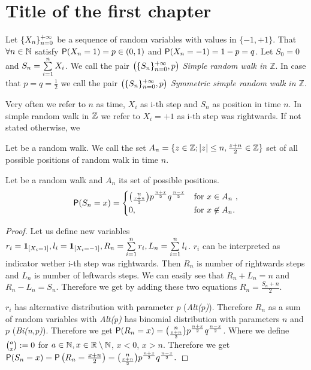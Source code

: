 \chapter{Title of the first chapter}

\begin{defn}\label{def01:1}
  Let $\{X_n\}_{n=0}^{+\infty}$ be a sequence of \iid random variables with values in $\{ -1, +1\}$. That $\forall n \in \mathbb{N}$ satisfy $\operatorname{\textsf{P}}(X_n=1)=p \in (0,1)$ and $\operatorname{\textsf{P}}(X_n=-1)=1-p=q$. Let $S_0=0$ and $S_n=\suma[i][1][n]X_i$. We call the pair $\left(\{S_n\}_{n=0}^{+\infty}, p \right)$ \emph{Simple random walk in $\mathbb{Z}$}. In case that $p=q=\frac{1}{2}$ we call the pair $\left(\{S_n\}_{n=0}^{+\infty}, p \right)$ \emph{Symmetric simple random walk in $\mathbb{Z}$}.
\end{defn}

\begin{rem}
  Very often we refer to $n$ as time, $X_i$ as i-th step and $S_n$ as position in time $n$. In simple random walk in $\mathbb{Z}$ we refer to $X_i=+1$ as i-th step was rightwards. If not stated otherwise, we
\end{rem}

\begin{defn}
  Let \rw be a random walk. We call the set $A_n=\{z \in \mathbb{Z}; \left|{z}\right|\leq n, \frac{z+n}{2}\in \mathbb{Z} \}$ set of all possible positions of random walk \rw in time $n$.
\end{defn}

\begin{thm}
  Let \rw be a random walk and $A_n$ its set of possible positions.
  \[
  \operatorname{\textsf{P}}(S_n=x)=
  \begin{cases}
  \binom{n}{\frac{x+n}{2}}p^{\frac{n+x}{2}}q^{\frac{n-x}{2}} & \text{for $x \in A_n$ },\\
  0, & \text{for $x \not\in A_n$}.
  \end{cases}
  \]
\end{thm}
\begin{proof}
  Let us define new variables $r_i=\indikator{X_i=1}, l_i=\indikator{X_i=-1}, R_n=\suma r_i, L_n=\suma l_i$. $r_i$ can be interpreted as indicator wether i-th step was rightwards. Then $R_n$ is number of rightwards steps and $L_n$ is number of leftwards steps. We can easily see that $R_n+L_n=n$ and $R_n-L_n=S_n$. Therefore we get by adding these two equations $R_n=\frac{S_n+n}{2}.$

  $r_i$ has alternative distribution with parameter $p$ (\textit{Alt(p)}). Therefore $R_n$ as a sum of \iid random variables with \textit{Alt(p)} has binomial distribution with parameters $n$ and $p$ (\textit{Bi(n,p)}). Therefore we get $\operatorname{\textsf{P}}(R_n=x)=\binom{n}{\frac{x+n}{2}}p^{\frac{n+x}{2}}q^{\frac{n-x}{2}}$. Where we define $\binom{a}{x}:= 0$ for $a \in \mathbb{N}, x\in \mathbb{R} \setminus \mathbb{N}$, $x<0$, $x>n$. Therefore we get $\operatorname{\textsf{P}}(S_n=x)=\operatorname{\textsf{P}}\left( R_n=\frac{x+n}{2}\right)=  \binom{n}{\frac{x+n}{2}}p^{\frac{n+x}{2}}q^{\frac{n-x}{2}}.$
\end{proof}



